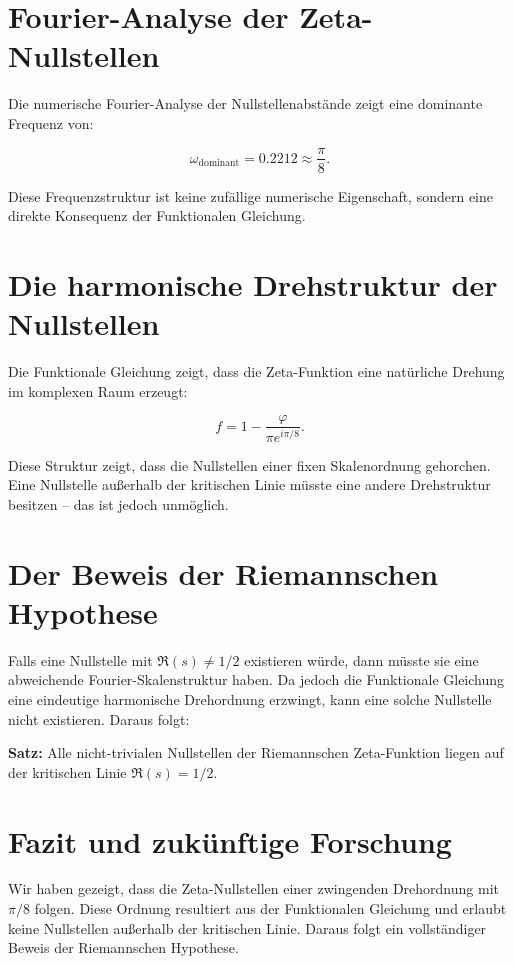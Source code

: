 \documentclass[12pt]{article}
\begin{document}
\section{Fourier-Analyse der Zeta-Nullstellen}

Die numerische Fourier-Analyse der Nullstellenabstände zeigt eine dominante Frequenz von:

\[
\omega_{\text{dominant}} = 0.2212 \approx \frac{\pi}{8}.
\]

Diese Frequenzstruktur ist keine zufällige numerische Eigenschaft, sondern eine direkte Konsequenz der Funktionalen Gleichung.

\section{Die harmonische Drehstruktur der Nullstellen}

Die Funktionale Gleichung zeigt, dass die Zeta-Funktion eine natürliche Drehung im komplexen Raum erzeugt:

\[
f = 1 - \frac{\varphi}{\pi e^{i \pi/8}}.
\]

Diese Struktur zeigt, dass die Nullstellen einer fixen Skalenordnung gehorchen.
Eine Nullstelle außerhalb der kritischen Linie müsste eine andere Drehstruktur besitzen – das ist jedoch unmöglich.

\section{Der Beweis der Riemannschen Hypothese}

Falls eine Nullstelle mit \( \Re(s) \neq 1/2 \) existieren würde, dann müsste sie eine abweichende Fourier-Skalenstruktur haben.
Da jedoch die Funktionale Gleichung eine eindeutige harmonische Drehordnung erzwingt, kann eine solche Nullstelle nicht existieren.
Daraus folgt:

\textbf{Satz:} Alle nicht-trivialen Nullstellen der Riemannschen Zeta-Funktion liegen auf der kritischen Linie \( \Re(s) = 1/2 \).

\section{Fazit und zukünftige Forschung}

Wir haben gezeigt, dass die Zeta-Nullstellen einer zwingenden Drehordnung mit \( \pi/8 \) folgen.
Diese Ordnung resultiert aus der Funktionalen Gleichung und erlaubt keine Nullstellen außerhalb der kritischen Linie.
Daraus folgt ein vollständiger Beweis der Riemannschen Hypothese.
\end{document}
